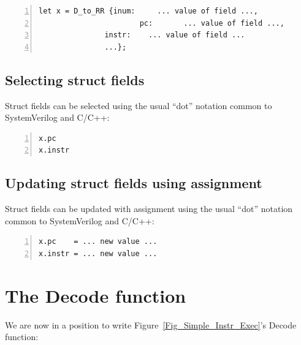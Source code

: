 \begin{Verbatim}[frame=single, numbers=left]
      let x = D_to_RR {inum:     ... value of field ...,
                       pc:       ... value of field ...,
		       instr:    ... value of field ...
		       ...};
\end{Verbatim}


\subsection{Selecting struct fields}


Struct fields can be selected using the usual ``dot'' notation common
to SystemVerilog and C/C++:

\begin{Verbatim}[frame=single, numbers=left]
x.pc
x.instr
\end{Verbatim}



\subsection{Updating struct fields using assignment}


Struct fields can be updated with assignment using the usual ``dot''
notation common to SystemVerilog and C/C++:

\begin{Verbatim}[frame=single, numbers=left]
x.pc    = ... new value ...
x.instr = ... new value ...
\end{Verbatim}


\section{The Decode function}

\label{Sec_Combo_Decode}


We are now in a position to write Figure~\ref{Fig_Simple_Instr_Exec}'s Decode function:

